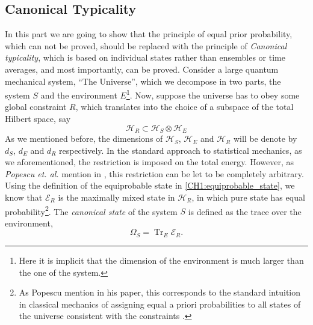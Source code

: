 \subsection{Canonical Typicality}
In this part we are going to show that the principle of equal prior probability, which can not be proved, should be replaced with the principle of \textit{Canonical typicality}, which is based on individual states rather than ensembles or time averages, and most importantly, can be proved.
\newline
Consider a large quantum mechanical system, ``The Universe'', which we decompose in two parts, the system $S$ and the environment $E$\footnote{Here it is implicit that the dimension of the environment is much larger than the one of the system.}. Now, suppose the universe has to obey some global constraint $R$, which translates into the choice of a subspace of the total Hilbert space, say
 \begin{equation}
 \mathcal{H}_{R} \subset \mathcal{H}_{S} \otimes \mathcal{H}_{E}
 \label{CH1:Tipicality_1}
 \end{equation}
As we mentioned before, the dimensions of $\mathcal{H}_{S}$, $\mathcal{H}_{E}$  and $\mathcal{H}_{R}$ will be denote by $d_S$, $d_E$ and $d_R$ respectively. In the standard approach to statistical mechanics, as we aforementioned, the restriction is imposed on the total energy. However, as \textit{Popescu et. al.} mention in \cite{popescu_entanglement_2006,popescu_foundations_2005}, this restriction can be let to be completely arbitrary.
\newline
Using the definition of the equiprobable state in \eqref{CH1:equiprobable_state}, we know that $\mathcal{E}_R$ is the maximally mixed state in $\mathcal{H}_R$, in which pure state has equal probability\footnote{As Popescu mention in his paper, this corresponds to the standard intuition in classical mechanics of assigning equal a priori probabilities to all states of the universe consistent with the constraints \cite{popescu_entanglement_2006,popescu_foundations_2005}.}.
\newline
The \textit{canonical state} of the system $S$ is defined as the trace over the environment,
\begin{equation}
\Omega_{S}=\operatorname{Tr}_{E} \mathcal{E}_{R}.
\label{CH1:Canonical_state}
\end{equation}

